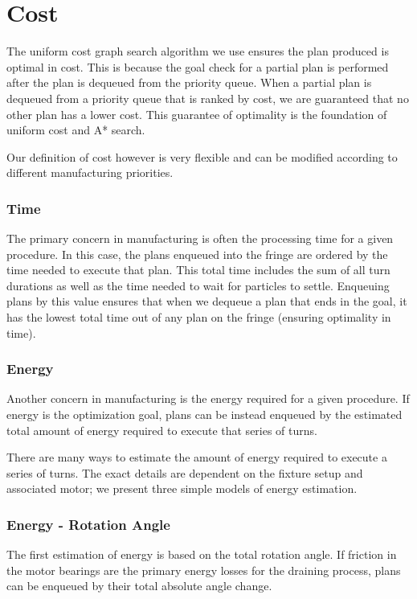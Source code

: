 \section{Cost}

The uniform cost graph search algorithm we use ensures the plan produced is optimal in cost. This is because the goal check for a partial plan is performed after the plan is dequeued from the priority queue. When a partial plan is dequeued from a priority queue that is ranked by cost, we are guaranteed that no other plan has a lower cost. This guarantee of optimality is the foundation of uniform cost and A* search.

Our definition of cost however is very flexible and can be modified according to different manufacturing priorities.

		\subsubsection{Time}

The primary concern in manufacturing is often the processing time for a given procedure. In this case, the plans enqueued into the fringe are ordered by the time needed to execute that plan. This total time includes the sum of all turn durations as well as the time needed to wait for particles to settle. Enqueuing plans by this value ensures that when we dequeue a plan that ends in the goal, it has the lowest total time out of any plan on the fringe (ensuring optimality in time).

		\subsubsection{Energy}

Another concern in manufacturing is the energy required for a given procedure. If energy is the optimization goal, plans can be instead enqueued by the estimated total amount of energy required to execute that series of turns.


There are many ways to estimate the amount of energy required to execute a series of turns. The exact details are dependent on the fixture setup and associated motor; we present three simple models of energy estimation.

		\subsubsection{Energy - Rotation Angle}

The first estimation of energy is based on the total rotation angle. If friction in the motor bearings are the primary energy losses for the draining process, plans can be enqueued by their total absolute angle change.

